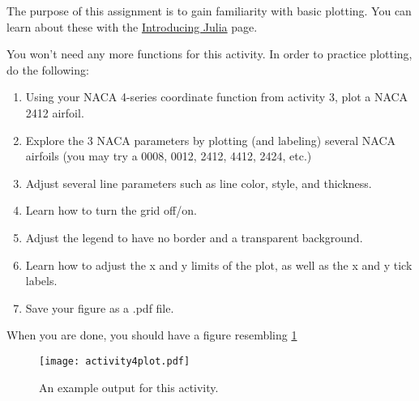 \documentclass{article}%
\begin{document}
The purpose of this assignment is to gain familiarity with basic plotting. You can learn about these with the \href{https://en.wikibooks.org/wiki/Introducing_Julia/Plotting}{Introducing Julia} page.

You won't need any more functions for this activity. In order to practice plotting, do the following:
\begin{enumerate}
	\item Using your NACA 4-series coordinate function from activity 3, plot a NACA 2412 airfoil.
	\item Explore the 3 NACA parameters by plotting (and labeling) several NACA airfoils (you may try a 0008, 0012, 2412, 4412, 2424, etc.)
	\item Adjust several line parameters such as line color, style, and thickness.
	\item Learn how to turn the grid off/on.
	\item Adjust the legend to have no border and a transparent background.
	\item Learn how to adjust the x and y limits of the plot, as well as the x and y tick labels.
	\item Save your figure as a .pdf file. 
\end{enumerate}

When you are done, you should have a figure resembling \cref{fig:airfoilplot}


\begin{figure}[h!]
	\centering
	\texttt{[image: activity4plot.pdf]}
	\caption{An example output for this activity.}
	\label{fig:airfoilplot}
\end{figure}
\end{document}
